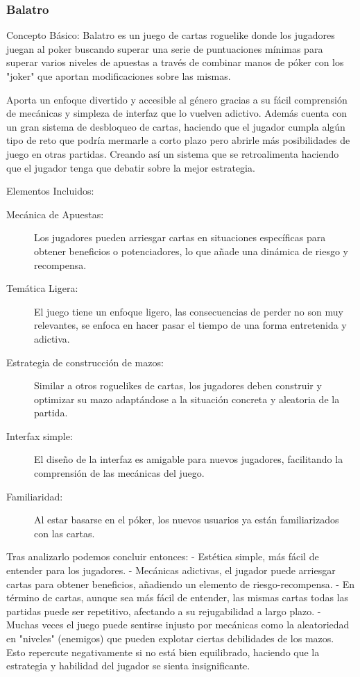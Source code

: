 \subsubsection{Balatro}
Concepto Básico: Balatro es un juego de cartas roguelike donde los jugadores juegan al poker buscando superar una serie de puntuaciones mínimas para  superar varios niveles de apuestas a través de combinar manos de póker con los "joker" que aportan modificaciones sobre las mismas.

Aporta un enfoque divertido y accesible al género gracias a su fácil comprensión de mecánicas y simpleza de interfaz que lo vuelven adictivo. Además cuenta con un gran sistema de desbloqueo de cartas, haciendo que el jugador cumpla algún tipo de reto que podría mermarle a corto plazo pero abrirle más posibilidades de juego en otras partidas. Creando así un sistema que se retroalimenta haciendo que el jugador tenga que debatir sobre la mejor estrategia.

Elementos Incluidos:
\begin{description}
    \item[Mecánica de Apuestas:] Los jugadores pueden arriesgar cartas en situaciones específicas para obtener beneficios o potenciadores, lo que añade una dinámica de riesgo y recompensa.
    \item[Temática Ligera:] El juego tiene un enfoque ligero, las consecuencias de perder no son muy relevantes, se enfoca en hacer pasar el tiempo de una forma entretenida y adictiva.
    \item[Estrategia de construcción de mazos:] Similar a otros roguelikes de cartas, los jugadores deben construir y optimizar su mazo adaptándose a la situación concreta y aleatoria de la partida.
    \item[Interfax simple:] El diseño de la interfaz es amigable para nuevos jugadores, facilitando la comprensión de las mecánicas del juego.
    \item[Familiaridad:] Al estar basarse en el póker, los nuevos usuarios ya están familiarizados con las cartas.     
\end{description}

Tras analizarlo podemos concluir entonces: 
- Estética simple, más fácil de entender para los jugadores.
- Mecánicas adictivas, el jugador puede arriesgar cartas para obtener beneficios, añadiendo un elemento de riesgo-recompensa.
- En término de cartas, aunque sea más fácil de entender, las mismas cartas todas las partidas puede ser repetitivo, afectando a su rejugabilidad a largo plazo.
- Muchas veces el juego puede sentirse injusto por mecánicas como la aleatoriedad en "niveles" (enemigos) que pueden explotar ciertas debilidades de los mazos. Esto repercute negativamente si no está bien equilibrado, haciendo que la estrategia y habilidad del jugador se sienta insignificante.

